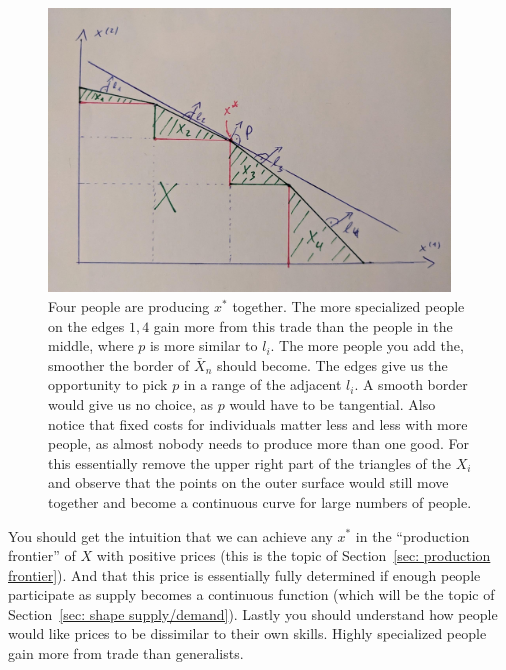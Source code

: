\begin{figure}
	\includegraphics[width=0.95\textwidth]{images/4_people_trade.jpeg}
	\caption{
		Four people are producing \(x^*\) together. The more specialized people
		on the edges \(1,4\) gain more from this trade than the people in the
		middle, where \(p\) is more similar to \(l_i\). The more people you add
		the, smoother the border of \(\bar{X}_n\) should become. The edges
		give us the opportunity to pick \(p\) in a range of the adjacent \(l_i\).
		A smooth border would give us no choice, as \(p\) would have to be
		tangential. Also notice that fixed costs for individuals matter less and
		less with more people, as almost nobody needs to produce more than one
		good. For this essentially remove the upper right part of the triangles
		of the \(X_i\) and observe that the points on the outer surface would
		still move together and become a continuous curve for large numbers of
		people.
	}	
\end{figure}

You should get the intuition that we can achieve any \(x^*\) in the ``production
frontier'' of \(X\) with positive prices (this is the topic of Section~\ref{sec:
production frontier}). And that this price is essentially fully determined if
enough people participate as supply becomes a continuous function (which will be
the topic of Section~\ref{sec: shape supply/demand}). Lastly you
should understand how people would like prices to be dissimilar to their own
skills. Highly specialized people gain more from trade than generalists.

\FloatBarrier
